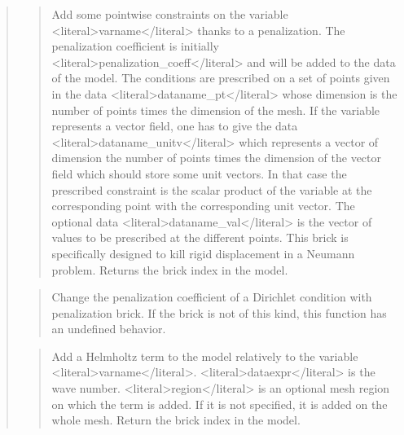 \documentclass[a4paper,11pt,english]{sphinxmanual}
\begin{document}
\begin{quote}
\sphinxAtStartPar
{}
\begin{quote}

\sphinxAtStartPar
Add some pointwise constraints on the variable \textless{}literal\textgreater{}varname\textless{}/literal\textgreater{} thanks to
a penalization. The penalization coefficient is initially
\textless{}literal\textgreater{}penalization\_coeff\textless{}/literal\textgreater{} and will be added to the data of the model.
The conditions are prescribed on a set of points given in the data
\textless{}literal\textgreater{}dataname\_pt\textless{}/literal\textgreater{} whose dimension is the number of points times the dimension
of the mesh.
If the variable represents a vector field, one has to give the data
\textless{}literal\textgreater{}dataname\_unitv\textless{}/literal\textgreater{} which represents a vector of dimension the number of
points times the dimension of the vector field which should store some
unit vectors. In that case the prescribed constraint is the scalar
product of the variable at the corresponding point with the corresponding
unit vector.
The optional data \textless{}literal\textgreater{}dataname\_val\textless{}/literal\textgreater{} is the vector of values to be prescribed
at the different points.
This brick is specifically designed to kill rigid displacement
in a Neumann problem.
Returns the brick index in the model.
\end{quote}

\sphinxAtStartPar
{}
\begin{quote}

\sphinxAtStartPar
Change the penalization coefficient of a Dirichlet condition with
penalization brick. If the brick is not of this kind, this
function has an undefined behavior.
\end{quote}

\sphinxAtStartPar
{}
\begin{quote}

\sphinxAtStartPar
Add a Helmholtz term to the model relatively to the variable \textless{}literal\textgreater{}varname\textless{}/literal\textgreater{}.
\textless{}literal\textgreater{}dataexpr\textless{}/literal\textgreater{} is the wave number. \textless{}literal\textgreater{}region\textless{}/literal\textgreater{} is an optional mesh
region on which the term is added. If it is not specified, it is added
on the whole mesh. Return the brick index in the model.
\end{quote}


\end{quote}
\end{document}
